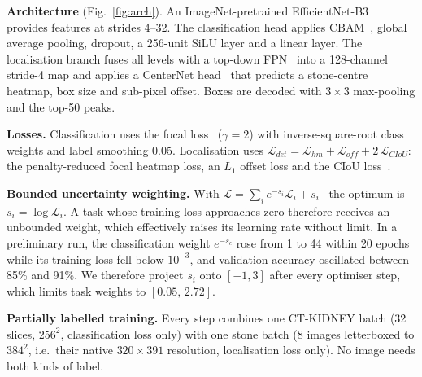 \documentclass[conference]{IEEEtran}
\begin{document}
\textbf{Architecture} (Fig.~\ref{fig:arch}). An ImageNet-pretrained EfficientNet-B3~\cite{tan2019efficientnet}
provides features at strides 4--32. The classification head applies CBAM~\cite{woo2018cbam}, global average
pooling, dropout, a 256-unit SiLU layer and a linear layer. The localisation branch fuses all levels with a
top-down FPN~\cite{lin2017fpn} into a 128-channel stride-4 map and applies a CenterNet head~\cite{zhou2019objects}
that predicts a stone-centre heatmap, box size and sub-pixel offset. Boxes are decoded with $3{\times}3$
max-pooling and the top-50 peaks.

\textbf{Losses.} Classification uses the focal loss~\cite{lin2017focal} ($\gamma{=}2$) with
inverse-square-root class weights and label smoothing 0.05. Localisation uses
$\mathcal{L}_{det}=\mathcal{L}_{hm}+\mathcal{L}_{off}+2\,\mathcal{L}_{CIoU}$: the penalty-reduced focal
heatmap loss, an $L_1$ offset loss and the CIoU loss~\cite{zheng2020diou}.

\textbf{Bounded uncertainty weighting.} With $\mathcal{L}=\sum_i e^{-s_i}\mathcal{L}_i+s_i$~\cite{kendall2018multi}
the optimum is $s_i=\log\mathcal{L}_i$. A task whose training loss approaches zero therefore receives an unbounded
weight, which effectively raises its learning rate without limit. In a preliminary run, the classification
weight $e^{-s_c}$ rose from 1 to 44 within 20 epochs while its training loss fell below $10^{-3}$, and
validation accuracy oscillated between 85\% and 91\%. We therefore project $s_i$ onto $[-1,3]$ after every
optimiser step, which limits task weights to $[0.05,\,2.72]$.

\textbf{Partially labelled training.} Every step combines one CT-KIDNEY batch (32 slices, $256^2$,
classification loss only) with one stone batch (8 images letterboxed to $384^2$, i.e.\ their native
$320{\times}391$ resolution, localisation loss only). No image needs both kinds of label.

\end{document}
